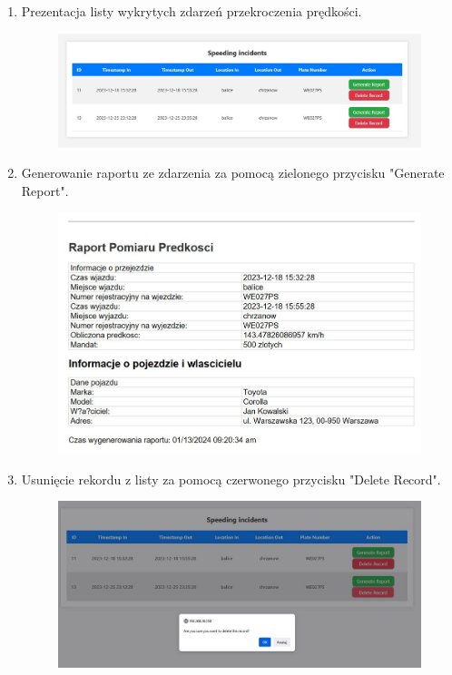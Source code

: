 \documentclass[12pt,a4paper,oneside]{article}
\theoremstyle{definition}
\numberwithin{equation}{section}
\begin{document}
\begin{enumerate}
  
  \item Prezentacja listy wykrytych zdarzeń przekroczenia prędkości.
        \begin{figure}[H]
          \includegraphics[width=\linewidth]{dokumentacja_uzytkowa/images/incidents.JPG}
          \label{fig:Prezentacja}
        \end{figure}
        \newpage
  
  \item Generowanie raportu ze zdarzenia za pomocą zielonego przycisku "Generate Report". 
        \begin{figure}[H]
          \includegraphics[width=\linewidth]{dokumentacja_uzytkowa/images/report.JPG}
          \label{fig:Generowanie}
        \end{figure}  
  \item Usunięcie rekordu z listy za pomocą czerwonego przycisku "Delete Record". 
        \begin{figure}[H]
          \includegraphics[width=\linewidth]{dokumentacja_uzytkowa/images/delete_1.JPG}
          \label{fig:Usunięcie}
        \end{figure}
        \newpage


\end{enumerate}
\end{document}
